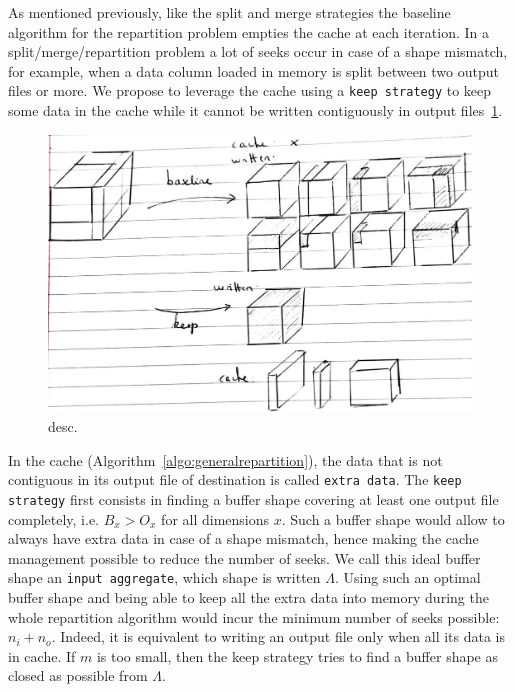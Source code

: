 \documentclass[conference]{IEEEtran}
\begin{document}
As mentioned previously, like the split and merge strategies the baseline
algorithm for the repartition problem empties the cache at each iteration. In a
split/merge/repartition problem a lot of seeks occur in case of a shape mismatch,
for example, when a data column loaded in memory is split between two output
files or more. We propose to leverage the cache using a \texttt{keep strategy}
to keep some data in the cache while it cannot be written contiguously in output
files~\ref{fig:keepvsbaseline}.

\begin{figure}[h]
\centering
\includegraphics[scale=0.25]{./figures/new/naive_vs_keep.jpeg}
\caption{desc.}
\label{fig:keepvsbaseline}
\end{figure}

In the cache (Algorithm~\ref{algo:generalrepartition}), the data that is not
contiguous in its output file of destination is called \texttt{extra data}.
The \texttt{keep strategy} first consists in finding a buffer shape covering at least
one output file completely, i.e. $B_x>O_x$ for all dimensions $x$.
Such a buffer shape would allow to always have extra data in case of a shape
mismatch, hence making the cache management possible to reduce the number of seeks.
We call this ideal buffer shape an \texttt{input aggregate}, which shape is
written $\Lambda$. Using such an optimal buffer shape and being able to keep all
the extra data into memory during the whole repartition algorithm would incur
the minimum number of seeks possible: $n_i + n_o$. Indeed, it is equivalent to
writing an output file only when all its data is in cache.
If $m$ is too small, then the keep strategy tries to find a buffer
shape as closed as possible from $\Lambda$.
\end{document}
